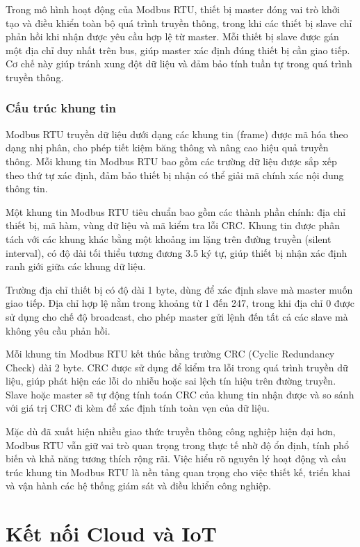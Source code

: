 Trong mô hình hoạt động của Modbus RTU, thiết bị master đóng vai trò khởi tạo và điều khiển toàn bộ quá trình truyền thông, trong khi các thiết bị slave chỉ phản hồi khi nhận được yêu cầu hợp lệ từ master. Mỗi thiết bị slave được gán một địa chỉ duy nhất trên bus, giúp master xác định đúng thiết bị cần giao tiếp. Cơ chế này giúp tránh xung đột dữ liệu và đảm bảo tính tuần tự trong quá trình truyền thông.


\subsubsection{Cấu trúc khung tin}


Modbus RTU truyền dữ liệu dưới dạng các khung tin (frame) được mã hóa theo dạng nhị phân, cho phép tiết kiệm băng thông và nâng cao hiệu quả truyền thông. Mỗi khung tin Modbus RTU bao gồm các trường dữ liệu được sắp xếp theo thứ tự xác định, đảm bảo thiết bị nhận có thể giải mã chính xác nội dung thông tin.


Một khung tin Modbus RTU tiêu chuẩn bao gồm các thành phần chính: địa chỉ thiết bị, mã hàm, vùng dữ liệu và mã kiểm tra lỗi CRC. Khung tin được phân tách với các khung khác bằng một khoảng im lặng trên đường truyền (silent interval), có độ dài tối thiểu tương đương 3.5 ký tự, giúp thiết bị nhận xác định ranh giới giữa các khung dữ liệu.


Trường địa chỉ thiết bị có độ dài 1 byte, dùng để xác định slave mà master muốn giao tiếp. Địa chỉ hợp lệ nằm trong khoảng từ 1 đến 247, trong khi địa chỉ 0 được sử dụng cho chế độ broadcast, cho phép master gửi lệnh đến tất cả các slave mà không yêu cầu phản hồi.


Mỗi khung tin Modbus RTU kết thúc bằng trường CRC (Cyclic Redundancy Check) dài 2 byte. CRC được sử dụng để kiểm tra lỗi trong quá trình truyền dữ liệu, giúp phát hiện các lỗi do nhiễu hoặc sai lệch tín hiệu trên đường truyền. Slave hoặc master sẽ tự động tính toán CRC của khung tin nhận được và so sánh với giá trị CRC đi kèm để xác định tính toàn vẹn của dữ liệu.


Mặc dù đã xuất hiện nhiều giao thức truyền thông công nghiệp hiện đại hơn, Modbus RTU vẫn giữ vai trò quan trọng trong thực tế nhờ độ ổn định, tính phổ biến và khả năng tương thích rộng rãi. Việc hiểu rõ nguyên lý hoạt động và cấu trúc khung tin Modbus RTU là nền tảng quan trọng cho việc thiết kế, triển khai và vận hành các hệ thống giám sát và điều khiển công nghiệp.

\section{Kết nối Cloud và IoT}
